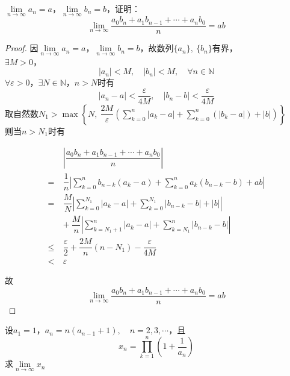 \begin{proposition}

    $\lim\limits_{n\to\infty}{a_n} = a $，$\lim\limits_{n\to\infty}{b_n} = b $，证明：
    $$\lim\limits_{n\to\infty}{\dfrac{a_0b_n + a_1b_{n-1} + \cdots + a_nb_0}{n}} = ab$$

\end{proposition}

\begin{proof}

    因$\lim\limits_{n\to\infty}{a_n} = a$，$\lim\limits_{n\to\infty}{b_n} = b $，故数列$\{a_n\},\ \{b_n\}$有界，\\
    $\exists M > 0$，
    $$|a_n| < M,\quad |b_n| < M, \quad \forall n \in \mathbb{N}$$
    $\forall \varepsilon > 0 $，$\exists N \in \mathbb{N}$，$n > N$时有
    $$|a_n -a| < \dfrac{\varepsilon}{4M}, \quad |b_n -b| < \dfrac{\varepsilon}{4M}$$
    取自然数$N_1 > \max\left\{N,\ \dfrac{2M}{\varepsilon}\left( \sum\limits_{k=0}^{n}{|a_k - a|} + \sum\limits_{k=0}^{n}{(|b_k - a|)} + |b| \right)\right\}$\\
    则当$n > N_1$时有

    \begin{align*}
        &\left| \dfrac{a_0b_n + a_1b_{n-1} + \cdots + a_nb_0}{n} \right| \\
        = \ & \dfrac{1}{n} \left| \sum\limits_{k=0}^{n}{b_{n-k}(a_k - a)} + \sum\limits_{k=0}^{n}{a_k(b_{n-k} - b)} + ab \right| \\
        = \ & \dfrac{M}{N} \left| \sum\limits_{k=0}^{N_1}{|a_k - a|} + \sum\limits_{k=0}^{N_1}{|b_{n-k} - b|} + |b| \right| \\
        \ & + \ \dfrac{M}{n} \left| \sum\limits_{k=N_1+1}^{n}{|a_k - a|} + \sum\limits_{k=N_1}^{n}{|b_{n-k} - b|} \right| \\
        \leq \ & \dfrac{\varepsilon}{2} + \dfrac{2M}{n}(n - N_1) - \dfrac{\varepsilon}{4M} \\
        < \ & \varepsilon 
    \end{align*}

    故
    $$\lim\limits_{n\to\infty}{\dfrac{a_0b_n + a_1b_{n-1} + \cdots + a_nb_0}{n}} = ab$$
    
\end{proof}

\begin{proposition}

    设$a_1 = 1$，$a_n = n(a_{n-1}+1),\quad n = 2,3,\cdots $，且
    $$x_n = \prod_{k=1}^{n}{\left(1+\dfrac{1}{a_n}\right)}$$
    求$\lim\limits_{n\to\infty}{x_n}$

\end{proposition}

